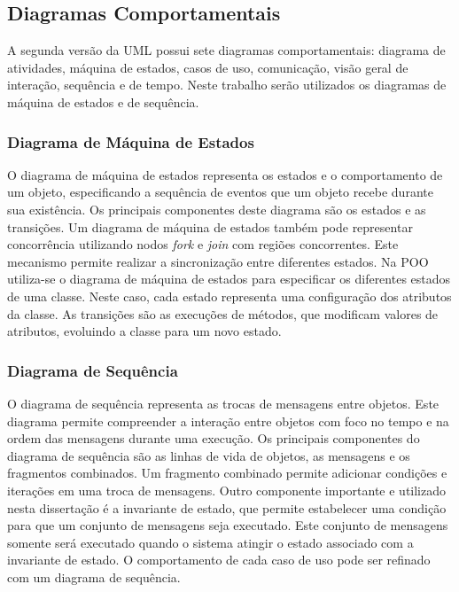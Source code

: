 \subsection{Diagramas Comportamentais}

A segunda versão da UML possui sete diagramas comportamentais: diagrama de atividades, máquina de estados, casos de uso, comunicação, visão geral de 
interação, sequência e de tempo. Neste trabalho serão utilizados os diagramas de máquina de estados e de sequência.

\subsubsection{Diagrama de Máquina de Estados}

O diagrama de máquina de estados representa os estados e o comportamento de um objeto, especificando a sequência de eventos que um objeto recebe
durante sua existência. Os principais componentes deste diagrama são os estados e as transições. Um diagrama de máquina de estados também pode
representar concorrência utilizando nodos \textit{fork} e \textit{join} com regiões concorrentes. Este mecanismo permite realizar a sincronização
entre diferentes estados. Na POO utiliza-se o diagrama de máquina de estados para especificar os diferentes estados de uma classe.
Neste caso, cada estado representa uma configuração dos atributos da classe. As transições são as execuções de métodos, que modificam valores de
atributos, evoluindo a classe para um novo estado.

\subsubsection{Diagrama de Sequência}

O diagrama de sequência representa as trocas de mensagens entre objetos. Este diagrama permite compreender a interação entre objetos com
foco no tempo e na ordem das mensagens durante uma execução. Os principais componentes do diagrama de sequência são as linhas de vida de objetos, as
mensagens e os fragmentos combinados. Um fragmento combinado permite adicionar condições e iterações em uma troca de mensagens. Outro componente
importante e utilizado nesta dissertação é a invariante de estado, que permite estabelecer uma condição para que um conjunto de mensagens seja
executado. Este conjunto de mensagens somente será executado quando o sistema atingir o estado associado com a invariante de estado. O comportamento
de cada caso de uso pode ser refinado com um diagrama de sequência.

